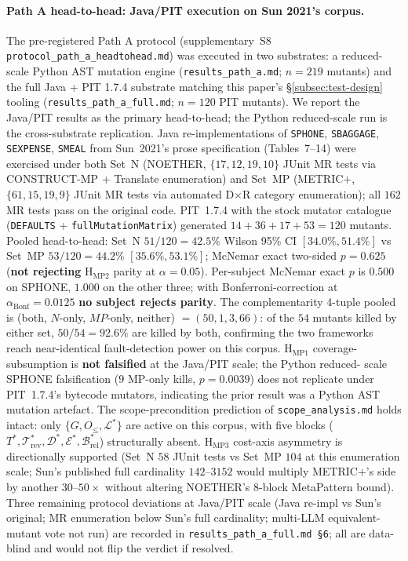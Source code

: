 \documentclass[manuscript]{acmart}
\begin{document}
\paragraph{Path A head-to-head: Java/PIT execution on Sun 2021's corpus.}
\label{para:path-a-results}
The pre-registered Path A protocol (supplementary~S8
\texttt{protocol\_path\_a\_headtohead.md}) was executed in two
substrates: a reduced-scale Python AST mutation engine
(\texttt{results\_path\_a.md}; $n = 219$ mutants) and the full
Java + PIT 1.7.4 substrate matching this paper's
\S\ref{subsec:test-design} tooling
(\texttt{results\_path\_a\_full.md}; $n = 120$ PIT mutants). We
report the Java/PIT results as the primary head-to-head; the Python
reduced-scale run is the cross-substrate replication. Java
re-implementations of \texttt{SPHONE}, \texttt{SBAGGAGE},
\texttt{SEXPENSE}, \texttt{SMEAL} from Sun~2021's prose
specification (Tables~7--14) were exercised under both Set~N
(NOETHER, $\{17, 12, 19, 10\}$ JUnit MR tests via CONSTRUCT-MP +
Translate enumeration) and Set~MP (METRIC$+$, $\{61, 15, 19, 9\}$
JUnit MR tests via automated D$\times$R category enumeration); all
$162$ MR tests pass on the original code. PIT~1.7.4 with the stock
mutator catalogue (\texttt{DEFAULTS} + \texttt{fullMutationMatrix})
generated $14 + 36 + 17 + 53 = 120$ mutants. Pooled head-to-head:
Set~N $51/120 = 42.5\%$ Wilson 95\% CI $[34.0\%, 51.4\%]$ vs Set~MP
$53/120 = 44.2\%$ $[35.6\%, 53.1\%]$; McNemar exact two-sided
$p = 0.625$ (\textbf{not rejecting} H$_{\mathrm{MP2}}$ parity at
$\alpha = 0.05$). Per-subject McNemar exact $p$ is $0.500$ on
SPHONE, $1.000$ on the other three; with Bonferroni-correction at
$\alpha_{\mathrm{Bonf}} = 0.0125$ \textbf{no subject rejects parity}.
The complementarity 4-tuple pooled is
(both, $N$-only, $MP$-only, neither) $= (50, 1, 3, 66)$: of the $54$
mutants killed by either set, $50/54 = 92.6\%$ are killed by both,
confirming the two frameworks reach near-identical fault-detection
power on this corpus. H$_{\mathrm{MP1}}$ coverage-subsumption is
\textbf{not falsified} at the Java/PIT scale; the Python reduced-
scale SPHONE falsification ($9$ MP-only kills, $p = 0.0039$) does
not replicate under PIT~1.7.4's bytecode mutators, indicating the
prior result was a Python AST mutation artefact. The
scope-precondition prediction of \texttt{scope\_analysis.md}
holds intact: only $\{G, O_{\le}, \mathcal{L}^{*}\}$ are active on
this corpus, with five blocks ($T^{*}, \mathcal{T}^{*}_{\mathrm{rev}},
\mathcal{D}^{*}, \mathcal{E}^{*}, \mathcal{B}^{*}_{\mathrm{rel}}$)
structurally absent. H$_{\mathrm{MP3}}$ cost-axis asymmetry is
directionally supported (Set~N $58$ JUnit tests vs Set~MP $104$ at
this enumeration scale; Sun's published full cardinality
$142$--$3152$ would multiply METRIC$+$'s side by another $30$--$50\times$
without altering NOETHER's $8$-block MetaPattern bound). Three
remaining protocol deviations at Java/PIT scale (Java re-impl vs
Sun's original; MR enumeration below Sun's full cardinality;
multi-LLM equivalent-mutant vote not run) are recorded in
\texttt{results\_path\_a\_full.md~\S 6}; all are data-blind and
would not flip the verdict if resolved.
\end{document}
